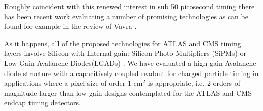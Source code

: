 \documentclass{article}
\begin{document}
Roughly coincident with this renewed interest in sub 50 picosecond timing there has been recent work evaluating a number of promising technologies as can be found for example in the review of Vavra \cite{Vavra}.



As it happens, all of the proposed technologies for ATLAS and CMS timing layers involve Silicon with Internal gain: Silicon Photo Multipliers (SiPMs) or Low Gain Avalanche Diodes(LGADs) \cite{cmsMIPtiming,atlasMIPtiming}. We have evaluated a high gain Avalanche diode structure with a capacitively coupled readout for charged particle timing in applications where a pixel size of order 1 cm$^{2}$ is appropriate, i.e. 2 orders of magnitude larger than low gain designs contemplated for the ATLAS and CMS endcap timing detectors.
\end{document}
